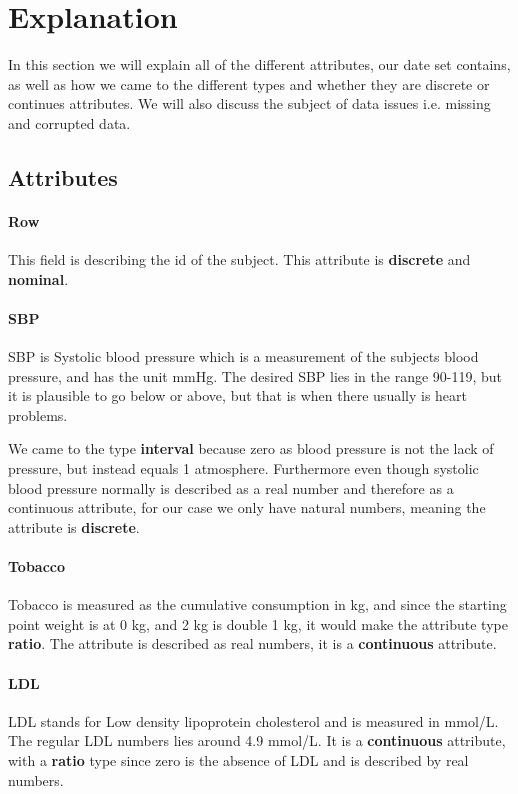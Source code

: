 \section{Explanation}
In this section we will explain all of the different attributes, our date set contains, as well as how we came to the different types and whether they are discrete or continues attributes. We will also discuss the subject of data issues i.e. missing and corrupted data.

\subsection{Attributes}

\paragraph{Row} This field is describing the id of the subject. This attribute is \textbf{discrete} and \textbf{nominal}.

\paragraph{SBP} SBP is Systolic blood pressure which is a measurement of the subjects blood pressure, and has the unit mmHg. The desired SBP lies in the range 90-119, but it is plausible to go below or above, but that is when there usually is heart problems.

We came to the type \textbf{interval} because zero as blood pressure is not the lack of pressure, but instead equals 1 atmosphere. Furthermore even though systolic blood pressure normally is described as a real number and therefore as a continuous attribute, for our case we only have natural numbers, meaning the attribute is \textbf{discrete}.%

\paragraph{Tobacco} Tobacco is measured as the cumulative consumption in kg, and since the starting point weight is at 0 kg, and 2 kg is double 1 kg, it would make the attribute type \textbf{ratio}.  The attribute is described as real numbers, it is a \textbf{continuous} attribute.

\paragraph{LDL} LDL stands for Low density lipoprotein cholesterol and is measured in mmol/L. The regular LDL numbers lies around 4.9 mmol/L. It is a \textbf{continuous} attribute, with a \textbf{ratio} type since zero is the absence of LDL and is described by real numbers.

